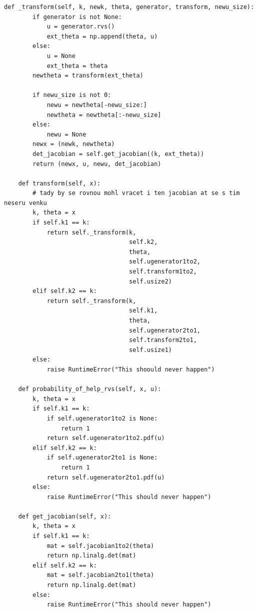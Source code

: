 \documentclass[czech,master,public,dept470,male,cpdeclaration,oneside, python]{diploma}
\begin{document}
\begin{lstlisting}[caption=Implementace přeskoků mezi dimenzemi]
    def _transform(self, k, newk, theta, generator, transform, newu_size):
        if generator is not None:
            u = generator.rvs()
            ext_theta = np.append(theta, u)
        else:
            u = None
            ext_theta = theta
        newtheta = transform(ext_theta)

        if newu_size is not 0:
            newu = newtheta[-newu_size:]
            newtheta = newtheta[:-newu_size]
        else:
            newu = None
        newx = (newk, newtheta)
        det_jacobian = self.get_jacobian((k, ext_theta))
        return (newx, u, newu, det_jacobian)

    def transform(self, x):
        # tady by se rovnou mohl vracet i ten jacobian at se s tim neseru venku
        k, theta = x
        if self.k1 == k:
            return self._transform(k,
                                   self.k2,
                                   theta,
                                   self.ugenerator1to2,
                                   self.transform1to2,
                                   self.usize2)
        elif self.k2 == k:
            return self._transform(k,
                                   self.k1,
                                   theta,
                                   self.ugenerator2to1,
                                   self.transform2to1,
                                   self.usize1)
        else:
            raise RuntimeError("This shoould never happen")

    def probability_of_help_rvs(self, x, u):
        k, theta = x
        if self.k1 == k:
            if self.ugenerator1to2 is None:
                return 1
            return self.ugenerator1to2.pdf(u)
        elif self.k2 == k:
            if self.ugenerator2to1 is None:
                return 1
            return self.ugenerator2to1.pdf(u)
        else:
            raise RuntimeError("This should never happen")

    def get_jacobian(self, x):
        k, theta = x
        if self.k1 == k:
            mat = self.jacobian1to2(theta)
            return np.linalg.det(mat)
        elif self.k2 == k:
            mat = self.jacobian2to1(theta)
            return np.linalg.det(mat)
        else:
            raise RuntimeError("This should never happen")
\end{lstlisting}
\end{document}
